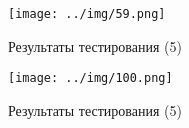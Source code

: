 \begin{figure}[!htb]\centering
	\texttt{[image: ../img/59.png]}
	\caption{Результаты тестирования (5)}
	\label{img:50}
\end{figure}

\begin{figure}[!htb]\centering
	\texttt{[image: ../img/100.png]}
	\caption{Результаты тестирования (5)}
	\label{img:100}
\end{figure}
